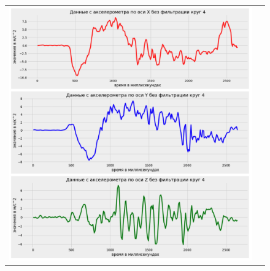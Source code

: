 \begin{figure}[H]
    \begin{center}
        \begin{tabular}{cc}
            \includegraphics[width=1\textwidth]{farim/im6.png} & 
        \end{tabular}
    \end{center}
\end{figure}


